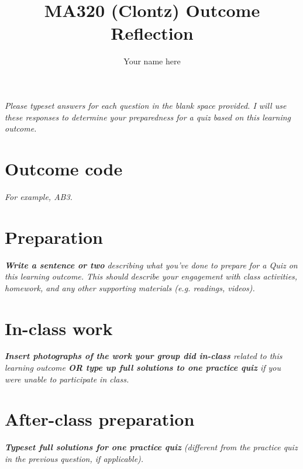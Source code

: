 \documentclass{article}
\title{MA320 (Clontz) Outcome Reflection}
\author{Your name here}
\begin{document}
\maketitle

\textit{Please typeset answers for each question in the blank space provided.
I will use these responses to determine your preparedness for a quiz
based on this learning outcome.}

\section{Outcome code}
\textit{For example, AB3.}








\section{Preparation}
\textit{\textbf{Write a sentence or two} describing what you’ve done to prepare for a Quiz on this learning outcome. This should describe your engagement with class activities, homework, and any other supporting materials (e.g. readings, videos).}








\section{In-class work}
\textit{\textbf{Insert photographs of the work your group did in-class} related to this learning outcome \textbf{OR type up full solutions to one practice quiz} if you were unable to participate in class.}






\section{After-class preparation}
\textit{\textbf{Typeset full solutions for one practice quiz} (different from the practice quiz in the previous question, if applicable).}
\end{document}
